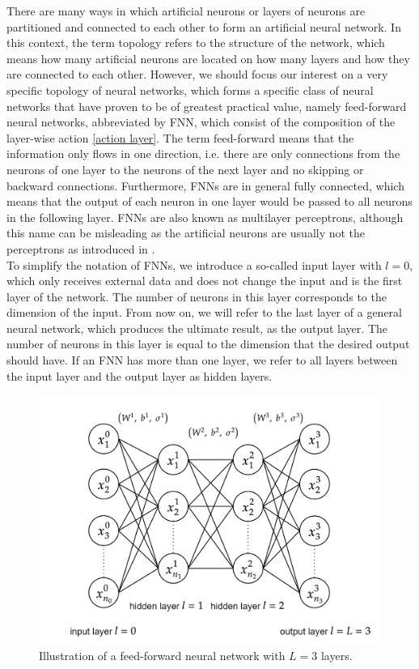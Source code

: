 There are many ways in which artificial neurons or layers of neurons are partitioned and connected to each other to form an artificial neural network. In this context, the term topology refers to the structure of the network, which means how many artificial neurons are located on how many layers and how they are connected to each other. However, we should focus our interest on a very specific topology of neural networks, which forms a specific class of neural networks that have proven to be of greatest practical value, namely feed-forward neural networks, abbreviated by FNN, which consist of the composition of the layer-wise action \cref{action layer}. The term feed-forward means that the information only flows in one direction, i.e. there are only connections from the neurons of one layer to the neurons of the next layer and no skipping or backward connections. Furthermore, FNNs are in general fully connected, which means that the output of each neuron in one layer would be passed to all neurons in the following layer. FNNs are also known as multilayer perceptrons, although this name can be misleading as the artificial neurons are usually not the perceptrons as introduced in \cite{Rosenblatt:1958}. \\
To simplify the notation of FNNs, we introduce a so-called input layer with $l=0$, which only receives external data and does not change the input and is the first layer of the network. The number of neurons in this layer corresponds to the dimension of the input. From now on, we will refer to the last layer of a general neural network, which produces the ultimate result, as the output layer. The number of neurons in this layer is equal to the dimension that the desired output should have. If an FNN has more than one layer, we refer to all layers between the input layer and the output layer as hidden layers. \\ 
\begin{figure}[H]
    \begin{center}
        \includegraphics[scale=0.2]{img/diagram-20220206.png}
    \end{center}
    \caption{Illustration of a feed-forward neural network with $L=3$ layers.}
    \label{fig5}
\end{figure}
